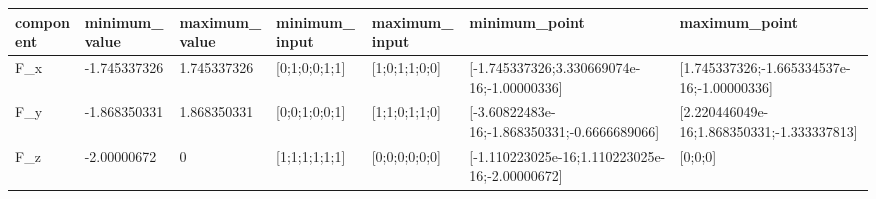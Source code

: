 \begin{tabular}{@{}lllllll@{}}
\toprule
component & minimum\_value & maximum\_value & minimum\_input & maximum\_input & minimum\_point & maximum\_point \\
\midrule
F\_x & -1.745337326 & 1.745337326 & [0;1;0;0;1;1] & [1;0;1;1;0;0] & [-1.745337326;3.330669074e-16;-1.00000336] & [1.745337326;-1.665334537e-16;-1.00000336] \\
F\_y & -1.868350331 & 1.868350331 & [0;0;1;0;0;1] & [1;1;0;1;1;0] & [-3.60822483e-16;-1.868350331;-0.6666689066] & [2.220446049e-16;1.868350331;-1.333337813] \\
F\_z & -2.00000672 & 0 & [1;1;1;1;1;1] & [0;0;0;0;0;0] & [-1.110223025e-16;1.110223025e-16;-2.00000672] & [0;0;0] \\
\bottomrule
\end{tabular}
